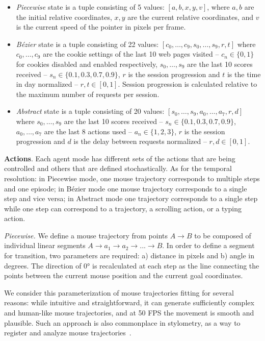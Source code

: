 \begin{itemize}
\item \emph{Piecewise} state is a tuple consisting of 5 values: $[a,b,x,y,v]$, where $a,b$ are the initial relative coordinates, $x,y$ are the current relative coordinates, and $v$ is the current speed of the pointer in pixels per frame.
\item \emph{Bézier} state is a tuple consisting of 22 values: $[c_0,\dots,c_9,s_0,\dots,s_9, r, t]$ where $c_0,\dots,c_9$ are the cookie settings of the last 10 web pages visited -- $c_n \in \{0,1\}$ for cookies disabled and enabled respectively, $s_0,\dots,s_9$ are the last 10 scores received -- $s_n \in \{0.1,0.3,0.7,0.9\}$, $r$ is the session progression and $t$ is the time in day normalized -- $r,t \in [0,1]$.
Session progression is calculated relative to the maximum number of requests per session.
\item \emph{Abstract} state is a tuple consisting of 20 values: $[s_0,\dots,s_9,a_0,\dots,a_7,r,d]$ where $s_0,\dots,s_9$ are the last 10 scores received -- $s_n \in \{0.1,0.3,0.7,0.9\}$, $a_0,\dots,a_7$ are the last 8 actions used -- $a_n \in \{1,2,3\}$, $r$ is the session progression and $d$ is the delay between requests normalized -- $r,d \in [0,1]$.
\end{itemize}

\textbf{Actions}. Each agent mode has different sets of the actions that are being controlled and others that are defined stochastically.
As for the temporal resolution: in Piecewise mode, one mouse trajectory corresponds to multiple steps and one episode; in Bézier mode one mouse trajectory corresponds to a single step and vice versa; in Abstract mode one trajectory corresponds to a single step while one step can correspond to a trajectory, a scrolling action, or a typing action.

\emph{Piecewise.} We define a mouse trajectory from points $A \rightarrow B$ to be composed of individual linear segments $A \rightarrow a_1 \rightarrow a_2 \rightarrow ... \rightarrow B$.
In order to define a segment for transition, two parameters are required: a) distance in pixels and b) angle in degrees. The direction of \ang{0} is recalculated at each step as the line connecting the points between the current mouse position and the current goal coordinates.

We consider this parameterization of mouse trajectories fitting for several reasons: while intuitive and straightforward, it can generate sufficiently complex and human-like mouse trajectories, and at 50 FPS the movement is smooth and plausible.
Such an approach is also commonplace in stylometry, as a way to register and analyze mouse trajectories~\cite{fridman2015multi}.

